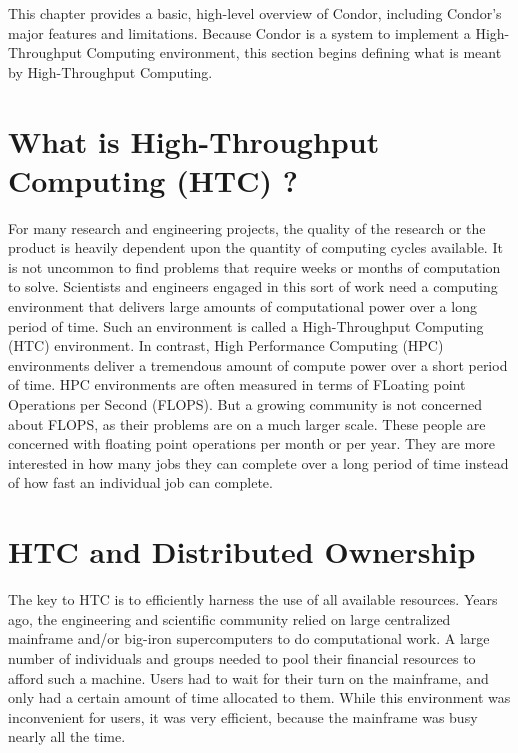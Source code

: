 
This chapter provides a basic, high-level overview of Condor, including
Condor's major features and limitations. Because Condor is a system to
implement a High-Throughput Computing environment, this section begins
defining what is meant by High-Throughput Computing.


\section{What is High-Throughput Computing (HTC) ?}

For many research and engineering projects, the quality of the research
or the product is heavily dependent upon the quantity of computing
cycles available. It is not uncommon to find problems that require weeks
or months of computation to solve. Scientists and engineers engaged in
this sort of work need a computing environment that delivers large
amounts of computational power over a long period of time. Such an
environment is called a High-Throughput Computing (HTC) environment.
In contrast, High Performance Computing (HPC)
environments deliver a
tremendous amount of compute power over a short period of time. HPC
environments are often measured in terms of FLoating point Operations
per Second (FLOPS). But a growing community is not concerned about
FLOPS, as their problems are on a much larger scale. These people are
concerned with floating point operations per month or per year. They are
more interested in how many jobs they can complete over a long period of
time instead of how fast an individual job can complete.

\section{HTC and Distributed Ownership}

The key to HTC is to efficiently harness the use of all available
resources. Years ago, the engineering and scientific community relied on
large centralized mainframe and/or big-iron supercomputers to do
computational work. A large number of individuals and groups needed
to pool their financial resources to afford such a machine. Users had
to wait for their turn on the mainframe, and only had a
certain amount of time allocated to them. While this environment was
inconvenient for users, it was very efficient, because the mainframe
was busy nearly all the time.


